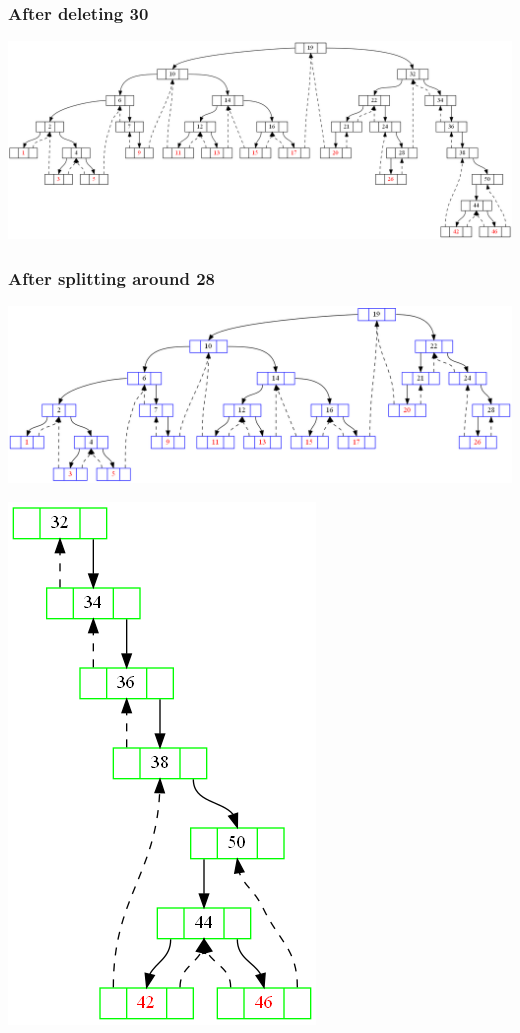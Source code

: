 \documentclass{article}
\begin{document}
\subsubsection{After deleting 30}
\begin{center}
\includegraphics[scale=0.3]{struct4.png}
\end{center}
\subsubsection{After splitting around 28}
\begin{center}
\includegraphics[scale=0.3]{struct5.png}
\end{center}
\begin{center}
\includegraphics[scale=0.3]{struct6.png}
\end{center}
\end{document}
